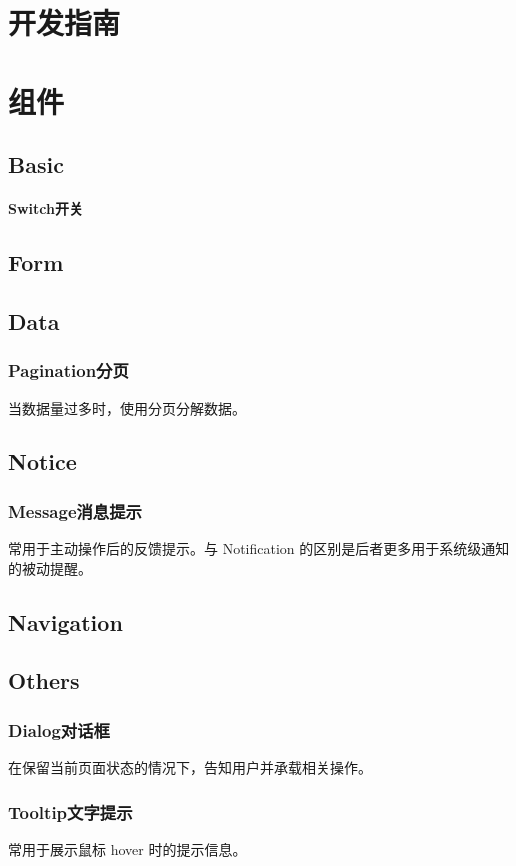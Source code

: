 \chapter{开发指南}
\chapter{组件}

\section{Basic}
\subsubsection{Switch开关}
\section{Form}
\section{Data}
\subsection{Pagination分页}
当数据量过多时，使用分页分解数据。
\section{Notice}
\subsection{Message消息提示}
常用于主动操作后的反馈提示。与 Notification 的区别是后者更多用于系统级通知的被动提醒。
\section{Navigation}
\section{Others}
\subsection{Dialog对话框}
在保留当前页面状态的情况下，告知用户并承载相关操作。
\subsection{Tooltip文字提示}
常用于展示鼠标 hover 时的提示信息。
